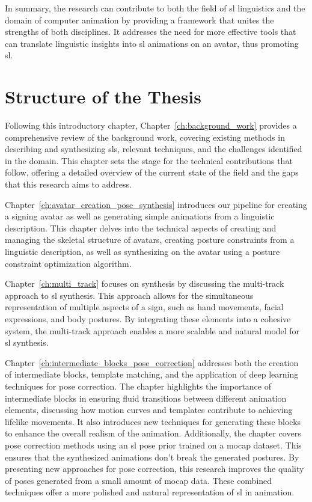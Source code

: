 \documentclass[../../main.tex]
{subfiles}
\begin{document}
In summary, the research can contribute to both the field of \gls{sl} linguistics and the domain of computer animation by providing a framework that unites the strengths of both disciplines. It addresses the need for more effective tools that can translate linguistic insights into \gls{sl} animations on an avatar, thus promoting \gls{sl}.

\section{Structure of the Thesis}
\label{ch:introduction:structure}

Following this introductory chapter, Chapter~\ref{ch:background_work} provides a comprehensive review of the background work, covering existing methods in describing and synthesizing \gls{sl}s, relevant techniques, and the challenges identified in the domain. This chapter sets the stage for the technical contributions that follow, offering a detailed overview of the current state of the field and the gaps that this research aims to address.

Chapter~\ref{ch:avatar_creation_pose_synthesis} introduces our pipeline for creating a signing avatar as well as generating simple animations from a linguistic description. This chapter delves into the technical aspects of creating and managing the skeletal structure of avatars, creating posture constraints from a linguistic description, as well as synthesizing on the avatar using a posture constraint optimization algorithm.

Chapter~\ref{ch:multi_track} focuses on synthesis by discussing the multi-track approach to \gls{sl} synthesis. This approach allows for the simultaneous representation of multiple aspects of a sign, such as hand movements, facial expressions, and body postures. By integrating these elements into a cohesive system, the multi-track approach enables a more scalable and natural model for \gls{sl} synthesis.

Chapter~\ref{ch:intermediate_blocks_pose_correction} addresses both the creation of intermediate blocks, template matching, and the application of deep learning techniques for pose correction. The chapter highlights the importance of intermediate blocks in ensuring fluid transitions between different animation elements, discussing how motion curves and templates contribute to achieving lifelike movements. It also introduces new techniques for generating these blocks to enhance the overall realism of the animation. Additionally, the chapter covers pose correction methods using an \gls{sl} pose prior trained on a \gls{mocap} dataset. This ensures that the synthesized animations don't break the generated postures. By presenting new approaches for pose correction, this research improves the quality of poses generated from a small amount of \gls{mocap} data. These combined techniques offer a more polished and natural representation of \gls{sl} in animation.
\end{document}
